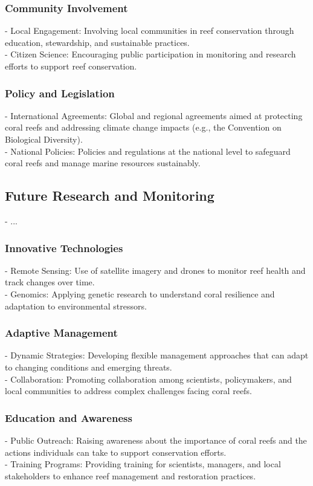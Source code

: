 \subsubsection{Community Involvement}
- Local Engagement: Involving local communities in reef conservation through education, stewardship, and sustainable practices. \\
- Citizen Science: Encouraging public participation in monitoring and research efforts to support reef conservation. 
\subsubsection{Policy and Legislation}
- International Agreements: Global and regional agreements aimed at protecting coral reefs and addressing climate change impacts (e.g., the Convention on Biological Diversity). \\
- National Policies: Policies and regulations at the national level to safeguard coral reefs and manage marine resources sustainably. 

\subsection{Future Research and Monitoring}
- ... 
\subsubsection{Innovative Technologies}
- Remote Sensing: Use of satellite imagery and drones to monitor reef health and track changes over time. \\
- Genomics: Applying genetic research to understand coral resilience and adaptation to environmental stressors. 
\subsubsection{Adaptive Management}
- Dynamic Strategies: Developing flexible management approaches that can adapt to changing conditions and emerging threats. \\
- Collaboration: Promoting collaboration among scientists, policymakers, and local communities to address complex challenges facing coral reefs.
\subsubsection{Education and Awareness}
- Public Outreach: Raising awareness about the importance of coral reefs and the actions individuals can take to support conservation efforts. \\
- Training Programs: Providing training for scientists, managers, and local stakeholders to enhance reef management and restoration practices.
